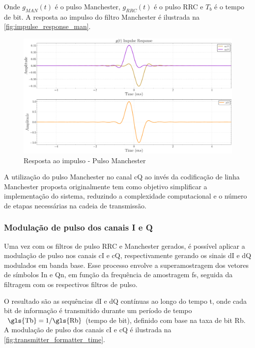 Onde $g_{MAN}(t)$ é o pulso Manchester, $g_{RRC}(t)$ é o pulso RRC e $T_b$ é o tempo de bit. A resposta ao impulso do filtro \gls{Manchester} é ilustrada na \autoref{fig:impulse_response_man}.

\begin{figure}[H]
	\centering
	\caption{Resposta ao impulso - Pulso Manchester}\label{fig:impulse_response_man}
	\includegraphics[width=\linewidth]{assets/cap3/example_formatter_impulse_man.pdf}
\end{figure}

A utilização do pulso \gls{Manchester} no canal \gls{cQ} ao invés da codificação de linha \gls{Manchester} proposta originalmente tem como objetivo simplificar a implementação do sistema, reduzindo a complexidade computacional e o número de etapas necessárias na cadeia de transmissão. 

\subsubsection{Modulação de pulso dos canais I e Q}

Uma vez com os filtros de pulso \gls{RRC} e \gls{Manchester} gerados, é possível aplicar a modulação de pulso nos canais \gls{cI} e \gls{cQ}, respectivamente gerando os sinais \gls{dI} e \gls{dQ} modulados em banda base. Esse processo envolve a superamostragem dos vetores de símbolos \gls{In} e \gls{Qn}, em função da frequência de amostragem \gls{fs}, seguida da filtragem com os respectivos filtros de pulso. 

O resultado são as sequências \gls{dI} e \gls{dQ} contínuas ao longo do tempo \gls{t}, onde cada bit de informação é transmitido durante um período de tempo $\text{ \gls{Tb}} = 1/ \text{\gls{Rb}}$ (tempo de bit), definido com base na taxa de bit \gls{Rb}. A modulação de pulso dos canais \gls{cI} e \gls{cQ} é ilustrada na \autoref{fig:transmitter_formatter_time}.

